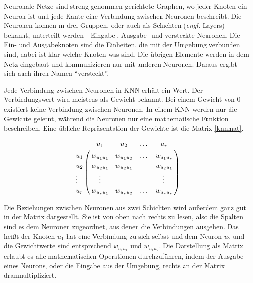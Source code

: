 Neuronale Netze sind streng genommen gerichtete Graphen, wo jeder Knoten ein Neuron ist und jede Kante eine Verbindung zwischen Neuronen beschreibt. Die Neuronen können in drei Gruppen, oder auch als Schichten (\textit{engl.} Layers) bekannt, unterteilt werden - Eingabe-, Ausgabe- und versteckte Neuronen. Die Ein- und Ausgabeknoten sind die Einheiten, die mit der Umgebung verbunden sind, dabei ist klar welche Knoten was sind. Die übrigen Elemente werden in dem Netz eingebaut und kommunizieren nur mit anderen Neuronen. Daraus ergibt sich auch ihren Namen ``versteckt''.

Jede Verbindung zwischen Neuronen in KNN erhält ein Wert. Der Verbindungswert wird meistens als Gewicht bekannt. Bei einem Gewicht von 0 existiert keine Verbindung zwischen Neuronen. In einem KNN werden nur die Gewichte gelernt, während die Neuronen nur eine mathematische Funktion beschreiben. Eine übliche Repräsentation der Gewichte ist die Matrix \ref{knnmat}.

\begin{align}
\centering
\bordermatrix{ 	
	& u_1 			& u_2			 & \dots & u_r			    \cr
	u_1    & w_{u_{1}u_{1}} & w_{u_{1}u_{2}} & \dots & w_{u_{1}u_r}		\cr
	u_2	   & w_{u_{2}u_{1}} & w_{u_{2}u_{1}} & 	     & w_{u_{2}u_{1}}	\cr
	\vdots & \vdots	      	& 			     &       & \vdots			\cr
	u_r    & w_{u_{r}u_{1}} & w_{u_{r}u_{2}} & \dots & w_{u_{r}u_r}  	\cr 
}
\label{knnmat}
\end{align}

Die Beziehungen zwischen Neuronen aus zwei Schichten wird außerdem ganz gut in der Matrix dargestellt. Sie ist von oben nach rechts zu lesen, also die Spalten sind es dem Neuronen zugeordnet, aus denen die Verbindungen ausgehen. Das heißt der Knoten $u_1$ hat eine Verbindung zu sich selbst und dem Neuron $u_2$ und die Gewichtwerte sind entsprechend $w_{u_{1}u_{1}}$ und $w_{u_{1}u_{2}}$. Die Darstellung als Matrix erlaubt es alle mathematischen Operationen durchzuführen, indem der Ausgabe eines Neurons, oder die Eingabe aus der Umgebung, rechts an der Matrix dranmultipliziert. \cite{CIKruse:15} \cite{NFMBothe:98} \cite{SCTemassi:01} \cite{CISCNFI:98}

